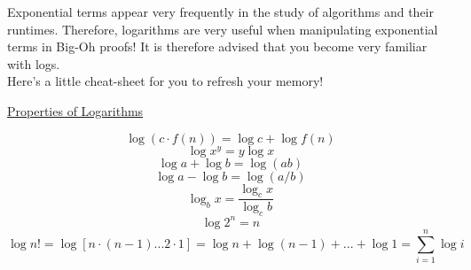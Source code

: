 Exponential terms appear very frequently in the study of algorithms and their runtimes. Therefore, logarithms are very useful when manipulating exponential terms in Big-Oh proofs! It is therefore advised that you become very familiar with logs.\\

Here's a little cheat-sheet for you to refresh your memory!

\begin{framed}
    \begin{center}
        \underline{Properties of Logarithms}
    \end{center}
    $$\log(c\cdot f(n)) = \log c + \log f(n)$$
    $$\log x^y = y \log x$$
    $$\log a + \log b = \log(ab)$$
    $$\log a - \log b = \log(a/b)$$
    $$\log_b x = \frac{\log_c x}{\log _c b}$$
    $$\log 2^n = n$$
    $$\log n! = \log [n\cdot(n-1)...2 \cdot 1] = \log n + \log(n-1) + ... + \log 1 = \sum_{i = 1}^n \log i$$
\end{framed}
